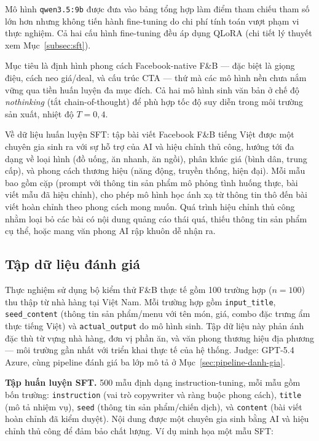 Mô hình \texttt{qwen3.5:9b} được đưa vào bảng tổng hợp làm điểm
tham chiếu tham số lớn hơn nhưng không tiến hành fine-tuning do chi
phí tính toán vượt phạm vi thực nghiệm. Cả hai cấu hình fine-tuning
đều áp dụng QLoRA (chi tiết lý thuyết xem Mục~\ref{subsec:sft}).

Mục tiêu là định hình phong cách Facebook-native F\&B --- đặc biệt
là giọng điệu, cách neo giá/deal, và cấu trúc CTA --- thứ mà các mô
hình nền chưa nắm vững qua tiền huấn luyện đa mục đích. Cả hai mô hình
sinh văn bản ở chế độ \emph{nothinking} (tắt chain-of-thought) để phù
hợp tốc độ suy diễn trong môi trường sản xuất, nhiệt độ $T = 0{,}4$.

Về dữ liệu huấn luyện SFT: tập bài viết Facebook F\&B tiếng Việt được
một chuyên gia sinh ra với sự hỗ trợ của AI và hiệu chỉnh thủ công, hướng
tới đa dạng về loại hình (đồ uống, ăn nhanh, ăn ngồi), phân khúc giá
(bình dân, trung cấp), và phong cách thương hiệu (năng động, truyền
thống, hiện đại). Mỗi mẫu bao gồm cặp (prompt với thông tin sản phẩm
mô phỏng tình huống thực, bài viết mẫu đã hiệu chỉnh), cho phép mô hình
học ánh xạ từ thông tin thô đến bài viết hoàn chỉnh theo phong cách
mong muốn. Quá trình hiệu chỉnh thủ công nhằm loại bỏ các bài có nội
dung quảng cáo thái quá, thiếu thông tin sản phẩm cụ thể, hoặc mang
văn phong AI rập khuôn dễ nhận ra.

\subsection{Tập dữ liệu đánh giá}

Thực nghiệm sử dụng bộ kiểm thử F\&B thực tế gồm 100 trường hợp
($n = 100$) thu thập từ nhà hàng tại Việt Nam. Mỗi
trường hợp gồm \texttt{input\_title}, \texttt{seed\_content} (thông tin
sản phẩm/menu với tên món, giá, combo đặc trưng ẩm thực tiếng Việt) và
\texttt{actual\_output} do mô hình sinh. Tập dữ liệu này phản ánh đặc
thù từ vựng nhà hàng, đơn vị phần ăn, và văn phong thương hiệu địa
phương --- môi trường gần nhất với triển khai thực tế của hệ thống.
Judge: GPT-5.4 Azure, cùng pipeline đánh giá ba lớp mô tả ở
Mục~\ref{sec:pipeline-danh-gia}.

\textbf{Tập huấn luyện SFT.} 500 mẫu định dạng instruction-tuning, mỗi
mẫu gồm bốn trường: \texttt{instruction} (vai trò copywriter và ràng buộc
phong cách), \texttt{title} (mô tả nhiệm vụ), \texttt{seed} (thông tin
sản phẩm/chiến dịch), và \texttt{content} (bài viết hoàn chỉnh đã kiểm
duyệt). Nội dung được một chuyên gia sinh bằng AI và hiệu chỉnh thủ công
để đảm bảo chất lượng. Ví dụ minh họa một mẫu SFT:

